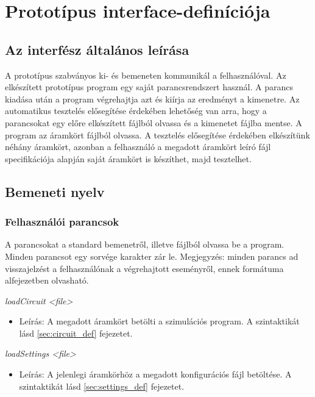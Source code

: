 \section{Prototípus interface-definíciója}

\subsection{Az interfész általános leírása}
A prototípus szabványos ki- és bemeneten kommunikál a felhasználóval. Az elkészített prototípus program egy
saját parancsrendszert használ. A parancs kiadása után a program végrehajtja azt és kiírja az eredményt a kimenetre. Az automatikus tesztelés elősegítése érdekében lehetőség van arra, hogy 
a parancsokat egy előre elkészített fájlból olvassa és a kimenetet fájlba mentse. A program az áramkört
fájlból olvassa. A tesztelés elősegítése érdekében elkészítünk néhány áramkört, azonban a felhasználó a megadott áramkört leíró fájl specifikációja alapján saját áramkört is készíthet, majd tesztelhet.

\subsection{Bemeneti nyelv}

\subsubsection{Felhasználói parancsok}

A parancsokat a standard bemenetről, illetve fájlból olvassa be a program. Minden parancsot egy sorvége karakter zár le.\newline
Megjegyzés: minden parancs ad visszajelzést a felhasználónak a végrehajtott eseményről, ennek formátuma  alfejezetben olvasható.\newline

\textit{loadCircuit <file>}
\begin{itemize}
	\item Leírás: A megadott áramkört betölti a szimulációs program. A szintaktikát lásd \ref{sec:circuit_def} fejezetet.
\end{itemize}

\textit{loadSettings <file>}
\begin{itemize}
	\item Leírás: A jelenlegi áramkörhöz a megadott konfigurációs fájl betöltése. A szintaktikát lásd \ref{sec:settings_def} fejezetet.
\end{itemize}

